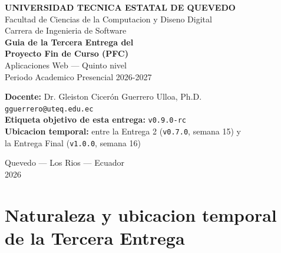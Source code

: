 \documentclass[11pt,a4paper]{article}
\begin{document}
\begin{center}
    \vspace*{1.5cm}
    {\Large\bfseries\textcolor{uteqverde}{UNIVERSIDAD TECNICA ESTATAL DE QUEVEDO}}\\[4pt]
    {\large Facultad de Ciencias de la Computacion y Diseno Digital}\\[2pt]
    {\large Carrera de Ingenieria de Software}\\[24pt]

    {\LARGE\bfseries Guia de la Tercera Entrega del}\\[6pt]
    {\LARGE\bfseries Proyecto Fin de Curso (PFC)}\\[18pt]

    {\large Aplicaciones Web --- Quinto nivel}\\[2pt]
    {\large Periodo Academico Presencial 2026-2027}\\[24pt]

    \begin{tcolorbox}[colback=uteqverde!8,colframe=uteqverde,arc=3pt,
                      width=0.85\textwidth,boxrule=0.8pt]
        \centering
        \textbf{Docente:} Dr. Gleiston Cicer\'on Guerrero Ulloa, Ph.D.\\[2pt]
        \texttt{gguerrero@uteq.edu.ec}\\[6pt]
        \textbf{Etiqueta objetivo de esta entrega:} \texttt{v0.9.0-rc}\\[2pt]
        \textbf{Ubicacion temporal:} entre la Entrega 2 (\texttt{v0.7.0}, semana 15) y\\ la Entrega Final (\texttt{v1.0.0}, semana 16)
    \end{tcolorbox}

    \vfill

    {\small Quevedo --- Los Rios --- Ecuador}\\[2pt]
    {\small 2026}
\end{center}

\newpage

\section{Naturaleza y ubicacion temporal de la Tercera Entrega}
\end{document}
